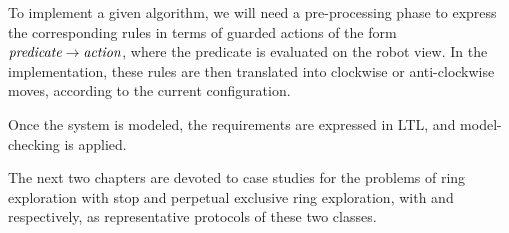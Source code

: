 \medskip To implement a given algorithm, we will need a pre-processing phase to express 
the corresponding rules in terms of guarded actions of the form $\emph{predicate} \rightarrow
\emph{action}$, where the predicate is evaluated on the robot view.
In the implementation, these rules are then translated into clockwise
or anti-clockwise moves, according to the current configuration.


Once the system is modeled, the requirements are expressed in \textsf{LTL}, and
model-checking is applied.

The next two chapters are devoted to case studies for the problems of
 ring exploration with stop and perpetual exclusive ring
exploration, with \cite{flocchini_computing_2007} and
\cite{blin_exclusive_2010} respectively, as representative protocols
of these two classes.

















